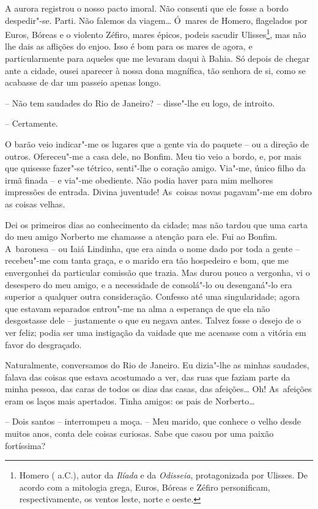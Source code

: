 A aurora registrou o nosso pacto imoral. Não consenti que ele fosse a
bordo despedir"-se. Parti. Não falemos da viagem\ldots{} Ó~mares de Homero,
flagelados por Euros, Bóreas e o violento Zéfiro, mares épicos, podeis
sacudir Ulisses\footnote{Homero ( a.C.), autor da \emph{Ilíada} e da
  \emph{Odisseia}, protagonizada por Ulisses. De acordo com a mitologia
  grega, Euros, Bóreas e Zéfiro personificam, respectivamente, os ventos
  leste, norte e oeste.}, mas não lhe dais as aflições do enjoo. Isso é
bom para os mares de agora, e particularmente para aqueles que me
levaram daqui à Bahia. Só depois de chegar ante a cidade, ousei aparecer
à nossa dona magnífica, tão senhora de si, como se acabasse de dar um
passeio apenas longo.

-- Não tem saudades do Rio de Janeiro? -- disse"-lhe eu logo, de
introito.

-- Certamente.

O barão veio indicar"-me os lugares que a gente via do paquete -- ou a
direção de outros. Ofereceu"-me a casa dele, no Bonfim. Meu tio veio a
bordo, e, por mais que quisesse fazer"-se tétrico, senti"-lhe o coração
amigo. Via"-me, único filho da irmã finada -- e via"-me obediente. Não
podia haver para mim melhores impressões de entrada. Divina juventude!
As~coisas novas pagavam"-me em dobro as coisas velhas.

Dei os primeiros dias ao conhecimento da cidade; mas não tardou que uma
carta do meu amigo Norberto me chamasse a atenção para ele. Fui ao
Bonfim. A~baronesa -- ou Iaiá Lindinha, que era ainda o nome dado por
toda a gente -- recebeu"-me com tanta graça, e o marido era tão
hospedeiro e bom, que me envergonhei da particular comissão que trazia.
Mas durou pouco a vergonha, vi o desespero do meu amigo, e a necessidade
de consolá"-lo ou desenganá"-lo era superior a qualquer outra
consideração. Confesso até uma singularidade; agora que estavam
separados entrou"-me na alma a esperança de que ela não desgostasse dele
-- justamente o que eu negava antes. Talvez fosse o desejo de o ver
feliz; podia ser uma instigação da vaidade que me acenasse com a vitória
em favor do desgraçado.

Naturalmente, conversamos do Rio de Janeiro. Eu dizia"-lhe as minhas
saudades, falava das coisas que estava acostumado a ver, das ruas que
faziam parte da minha pessoa, das caras de todos os dias das casas, das
afeições\ldots{} Oh! As~afeições eram os laços mais apertados. Tinha amigos:
os pais de Norberto\ldots{}

-- Dois santos -- interrompeu a moça. -- Meu marido, que conhece o velho
desde muitos anos, conta dele coisas curiosas. Sabe que casou por uma
paixão fortíssima?

